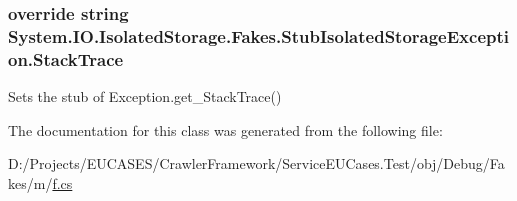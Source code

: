 \hypertarget{class_system_1_1_i_o_1_1_isolated_storage_1_1_fakes_1_1_stub_isolated_storage_exception_ae0006324fd838839924cb0a72afb6232}{
\subsubsection[{Stack\-Trace}]{\setlength{\rightskip}{0pt plus 5cm}override string System.\-I\-O.\-Isolated\-Storage.\-Fakes.\-Stub\-Isolated\-Storage\-Exception.\-Stack\-Trace\hspace{0.3cm}{\ttfamily [get]}}}\label{class_system_1_1_i_o_1_1_isolated_storage_1_1_fakes_1_1_stub_isolated_storage_exception_ae0006324fd838839924cb0a72afb6232}


Sets the stub of Exception.\-get\-\_\-\-Stack\-Trace()



The documentation for this class was generated from the following file\-:\begin{DoxyCompactItemize}
\item 
D\-:/\-Projects/\-E\-U\-C\-A\-S\-E\-S/\-Crawler\-Framework/\-Service\-E\-U\-Cases.\-Test/obj/\-Debug/\-Fakes/m/\hyperlink{m_2f_8cs}{f.\-cs}\end{DoxyCompactItemize}
